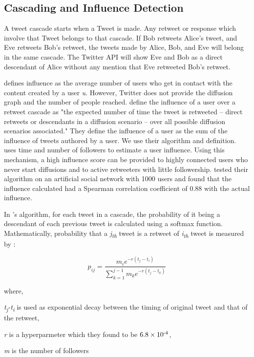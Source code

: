 \documentclass[letterpaper]{article}
\begin{document}
\subsection{Cascading and Influence Detection}
A tweet cascade starts when a Tweet is made. Any retweet or response which involve that Tweet belongs to that cascade. If Bob retweets Alice's tweet, and Eve retweets Bob's retweet, the tweets
made by Alice, Bob, and Eve will belong in the same cascade. The Twitter API will show Eve and Bob as a direct descendant of Alice without any mention that Eve retweeted Bob's retweet. \par

\cite{du2013scalable} defines influence as the average number of users who get in contact with the content created by a user \textit{u}.
 However, Twitter does not provide the diffusion graph and the number of people reached. \cite{rizoiu2018debatenight} define the influence of a user over a retweet cascade as "the expected number of time the tweet is
 retweeted – direct retweets or descendants in a diffusion scenario – over all possible diffusion scenarios  associated." They define the influence of a user as the sum of the influence of tweets
 authored by a user. We use their algorithm and definition. \cite{rizoiu2018debatenight} uses time and 
 number of followers to estimate a user influence. Using this mechanism, a high influence score can be provided to highly connected users who never start diffusions and 
 to active retweeters with little followership. \cite{rizoiu2018debatenight} tested their algorithm on an artificial social network with 1000 users and found that the influence calculated had a Spearman 
 correlation coefficient of 0.88 with the actual influence. \par 

In \cite{rizoiu2018debatenight}'s algorithm, for each tweet in a cascade, the probability of it being a descendant of each previous tweet is calculated using a softmax function. Mathematically, probability that a \textit{j\textsubscript{th}} 
tweet is a retweet of \textit{i\textsubscript{th}} tweet is measured by :\linebreak

\begin{equation*}
    p_{ij}=\frac{{m_{i}e^{-r(t_j-t_i)}}}{\sum_{k=1}^{j-1}m_ke^{-r(t_j-t_k)}}
    \label{eq:probablity}
\end{equation*}

where, \par
\textit{t\textsubscript{j}{-}t\textsubscript{i}} is used as exponential decay between the timing of original tweet and that of the retweet, \par
\textit{r} is a hyperparmeter which they found to be $6.8\times10\textsuperscript{-4}$, \par
\textit{m} is the number of followers \linebreak
\end{document}
